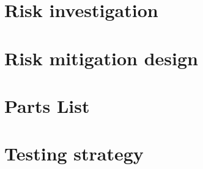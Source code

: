 \documentclass[12pt]{article}
\newcounter{engineering}
\begin{document}
\section{Risk investigation}
\section{Risk mitigation design}
\section{Parts List}
\section{Testing strategy}
\end{document}
